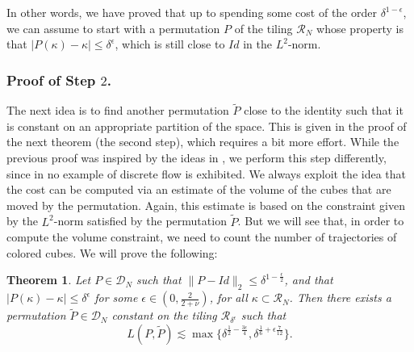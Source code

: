 \documentclass[12 pt]{article}
\theoremstyle{definition} \newtheorem{definition}{Definition}[section]
\theoremstyle{definition} \newtheorem{remark}[definition]{Remark}
\theoremstyle{plain} \newtheorem{lemma}[definition]{Lemma}
\theoremstyle{plain} \newtheorem{proposition}[definition]{Proposition}
\theoremstyle{plain} \newtheorem{theorem}[definition]{Theorem}
\theoremstyle{plain} \newtheorem{corollary}[definition]{Corollary}
\theoremstyle{definition} \newtheorem{example}[definition]{Example}
\theoremstyle{definition} \newtheorem{assumption}[definition]{Assumption}
\theoremstyle{definition} \newtheorem{conjecture}[definition]{Conjecture}
\newcommand{\1}{\mathbbm 1}
\numberwithin{equation}{section}
\begin{document}
In other words, we have proved that up to spending some cost of the order $\delta^{1-\epsilon}$, we can assume to start with a permutation $P$ of the tiling $\mathcal{R}_N$ whose property is that $|P(\kappa)-\kappa|\leq \delta^\epsilon$, which is still close to $Id$ in the $L^2$-norm. 

\subsubsection{Proof of Step $2$.}\label{sss:step:2}
The next idea is to find another permutation $\tilde P$ close to the identity such that it is constant on an appropriate partition of the space. This is given in the proof of the next theorem (the second step), which requires a bit more effort. While the previous proof was inspired by the ideas in \cite{Shnirelman}, we perform this step differently, since in \cite{Shnirelman} no example of discrete flow is exhibited. We always exploit the idea that the cost can be computed via an estimate of the volume of the cubes that are moved by the permutation. Again, this estimate is based on the constraint given by the $L^2$-norm satisfied by the permutation $\tilde P$. But we will see that, in order to compute the volume constraint,  we need to count the number of trajectories of colored cubes. We will prove the following:


\begin{theorem}\label{thm:problem:step:2}
    Let $P\in\mathcal{D}_N$ such that $\|P-Id\|_2\leq\delta^{1-\frac{\epsilon}{2}}$, and that $|P(\kappa)-\kappa|\leq \delta^\epsilon$ for some $\epsilon\in(0,\frac{2}{2+\nu})$, for all $\kappa\subset\mathcal{R}_N$. Then there exists a  permutation $\tilde P\in\mathcal{D}_N$ constant on the tiling $\mathcal{R}_{\delta^{\epsilon}}$ such that 
    \begin{equation}
        \label{eq:cost:step:2}
        L(P,\tilde P)\lesssim\max\lbrace \delta^{\frac{1}{2}-\frac{3\epsilon}{4}},\delta^{\frac{1}{6}+\epsilon\frac{7}{12}}\rbrace.
    \end{equation}
\end{theorem}
\end{document}
